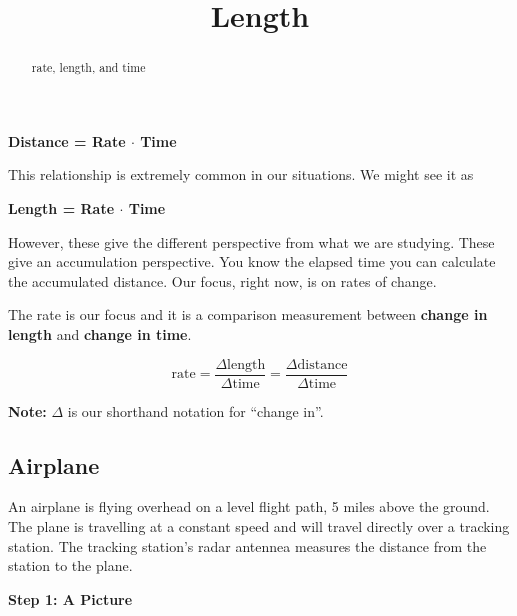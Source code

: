 \documentclass{ximera}
\title{Length}
\begin{document}
\begin{abstract}
rate, length, and time
\end{abstract}
\maketitle




\begin{center}
\textbf{\textcolor{purple!85!blue}{Distance = Rate $\cdot$ Time}} 
\end{center}

This relationship is extremely common in our situations.  We might see it as



\begin{center}
\textbf{\textcolor{purple!85!blue}{Length = Rate $\cdot$ Time}} 
\end{center}



However, these give the different perspective from what we are studying.  These give an accumulation perspective. You  know the elapsed time you can calculate the accumulated distance.  Our focus, right now, is on rates of change. 


The rate is our focus and it is a comparison measurement between \textbf{\textcolor{red!70!black}{change in length}} and \textbf{\textcolor{red!70!black}{change in time}}.



\[
\text{rate} = \frac{\Delta \text{length}}{\Delta \text{time}} = \frac{\Delta \text{distance}}{\Delta \text{time}}
\]

\textbf{Note:} $\Delta$ is our shorthand notation for ``change in''. \\






\subsection*{Airplane}

An airplane is flying overhead on a level flight path, 5 miles above the ground.  The plane is travelling at a constant speed and will travel directly over a tracking station. The tracking station's radar antennea measures the distance from the station to the plane.






\textbf{\textcolor{purple!85!blue}{Step 1: A Picture}}
\end{document}
